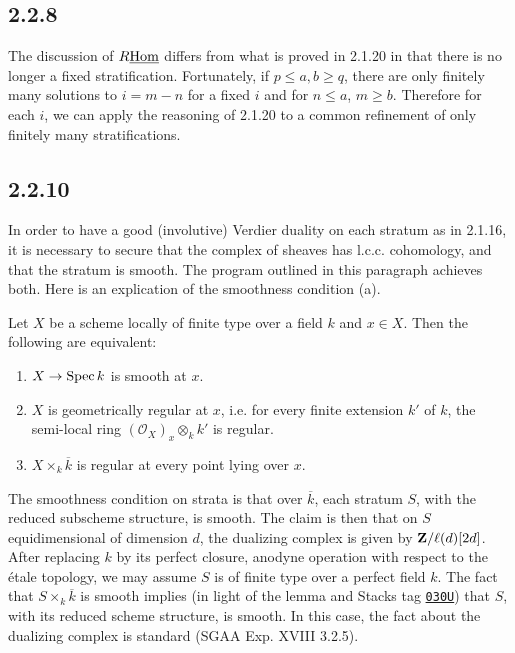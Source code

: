 \documentclass[deligne.tex]{subfiles}
\begin{document}
	\subsection*{2.2.8} The discussion of $R\underline{\operatorname{Hom}}$ differs from what
	is proved in 2.1.20 in that there is no longer a fixed stratification.
	Fortunately, if $p\leq a,b\geq q$, there are only finitely many solutions
	to $i=m-n$ for a fixed $i$ and for $n\leq a$, $m\geq b$. Therefore for
	each $i$, we can apply the reasoning of 2.1.20 to a common refinement
	of only finitely many stratifications.
	
	\subsection*{2.2.10}\label{BBD:2.2.10} In order to have a good (involutive) Verdier duality
	on each
	stratum as in 2.1.16, it is necessary to secure that the complex of
	sheaves has l.c.c. cohomology, and that the stratum is smooth.
	The program outlined in this paragraph achieves both.
	Here is an explication of the smoothness condition (a).
	\begin{lemma*}
		Let $X$ be a scheme locally of finite type over a field $k$ and
		$x\in X$. Then the following are equivalent:
		\begin{enumerate}[label=(\roman*)]
			\item $X\rightarrow\operatorname{Spec} k$ is smooth at $x$.
			\item $X$ is geometrically regular at $x$, i.e. for every finite extension $k'$ of $k$, the semi-local ring $(\mathcal O_X)_x\otimes_k k'$ is regular.
			\item $X\times_k \overline k$ is regular at every point lying over $x$.
		\end{enumerate}
	\end{lemma*}
	The smoothness condition on strata is that over $\overline k$, each
	stratum $S$, with the reduced subscheme structure, is smooth.
	The claim is then that on $S$ equidimensional of dimension $d$, the
	dualizing complex is given by $\mathbf{Z}/\ell(d)[2d]$.
	After replacing $k$ by its perfect closure, anodyne operation with
	respect to the étale topology, we may assume $S$ is of finite type over a
	perfect field $k$. The fact that $S\times_k\overline k$ is smooth implies
	(in light of the lemma and Stacks tag 
	\href{https://stacks.math.columbia.edu/tag/030U}{\texttt{030U}})
	that $S$, with its reduced scheme structure, is smooth.
	In this case, the fact about the dualizing complex is standard
	(SGAA Exp. XVIII 3.2.5).
	
\end{document}
